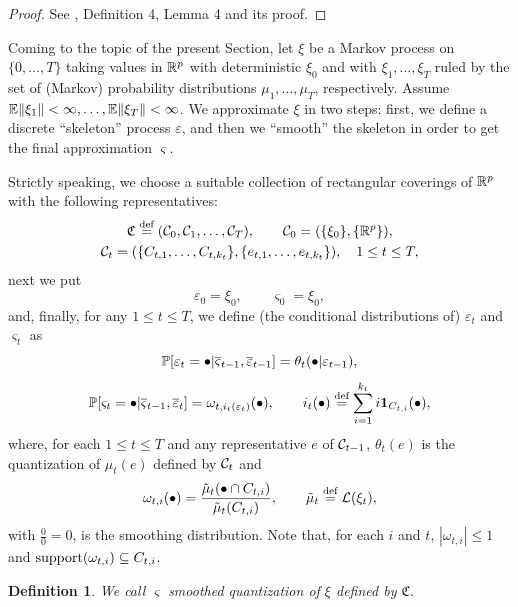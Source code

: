 \documentclass{article}              %
\newtheorem{definition}{Definition}
\begin{document}
\begin{proof}
See \cite{Smid09c}, Definition 4, Lemma 4 and its proof. 
\end{proof}

\noindent Coming to the topic of the present Section, let $\xi$ be a Markov process
on $\{0,\dots,T\}$ taking values in $\mathbb{R}^{p}$ with deterministic $\xi_{0}$ and with $\xi_1,\dots,\xi_T$ ruled by 
the set of (Markov) probability distributions $\mu_{1},\dots,\mu_{T}$, respectively. Assume $\mathbb{E}\|\xi_{1}\|<\infty,\dots,\mathbb{E}\|\xi_{T}\|<\infty$. We approximate $\xi$ in two steps: first, we define a discrete ``skeleton'' process $\varepsilon$, and then we ``smooth'' the skeleton in order to get the final approximation $\varsigma$. 

Strictly speaking, we choose a suitable collection of rectangular coverings of $\mathbb{R}^{p}$ with the following representatives: 
\begin{multline*}
\mathfrak{C}\stackrel{\text{\rm def}}{=}(\mathcal{C}_{0},\mathcal{C}_{1},\dots,\mathcal{C}_{T}),\qquad\mathcal{C}_{0}=(\{\xi_{0}\},\{\mathbb{R}^{p}\}),\\
\mathcal{C}_{t}=(\{C_{t,1},\dots,C_{t,k_{t}}\},\{e_{t,1},\dots,e_{t,k_{t}}\}),\quad1\leq t\leq T,
\end{multline*}
next  we put
\[
\varepsilon_{0}=\xi_{0},\qquad\varsigma_{0}=\xi_{0},
\]
and, finally, for any $1\leq t\leq T$, we define (the conditional distributions of) $\varepsilon_t$ and $\varsigma_t$ as  
\begin{equation}
\mathbb{P}[\varepsilon_{t}=\bullet|\overline{\varsigma}_{t-1},\overline{\varepsilon}_{t-1}]=\theta_{t}(\bullet|\varepsilon_{t-1}),\label{eq:skelet}
\end{equation}
\begin{equation}
\mathbb{P}[\varsigma_{t}=\bullet|\overline{\varsigma}_{t-1},\overline{\varepsilon}_{t}]=\omega_{t,i_{t}(\varepsilon_{t})}(\bullet),\qquad i_{t}(\bullet)\stackrel{\text{\rm def}}{=}\sum_{i=1}^{k_{t}}i\mathbf{1}_{C_{t,i}}(\bullet),\label{eq:vsdef}
\end{equation}
where, 
for each $1\leq t\leq T$ and any representative $e$ of $\mathcal{C}_{t-1}$,
$\theta_{t}(e)$ is the quantization of $\mu_{t}(e)$ defined by $\mathcal{C}_{t}$
and 
\[
\omega_{t,i}(\bullet)=\frac{\tilde{\mu}_{t}(\bullet\cap C_{t,i})}{\tilde{\mu}_{t}(C_{t,i})},\qquad\tilde{\mu}_{t}\stackrel{\text{\rm def}}{=}\mathcal{L}(\xi_{t}),
\]
with $\frac{0}{0}=0$, is the smoothing distribution. Note that, for each $i$ and $t$, $|\omega_{t,i}|\leq1$
and $\mathrm{support}(\omega_{t,i})\subseteq C_{t,i}$. 

\begin{definition}
We call $\varsigma$ \emph{smoothed quantization of $\xi$ defined
by $\mathfrak{C}.$}
\end{definition}
\end{document}
